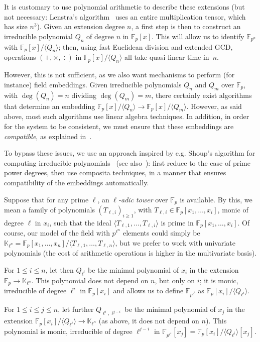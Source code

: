 \documentclass{sig-alternate}
\def\F {\ensuremath{\mathbb{F}}}
\def\K {\ensuremath{\mathbb{K}}}
\newcounter{algo}
\newcommand{\ang}[1]{\langle#1\rangle}
\begin{document}
It is customary to use polynomial arithmetic to describe these
extensions (but not necessary: Lenstra's algorithm~\cite{LenstraJr91}
uses an entire multiplication tensor, which has size $n^3$). Given an
extension degree $n$, a first step is then to construct an irreducible
polynomial $Q_n$ of degree $n$ in $\F_p[x]$. This will allow us to
identify $\F_{p^n}$ with $\F_p[x]/\ang{Q_n}$; then, using fast
Euclidean division and extended GCD, operations $(+,\times,\div)$ in
$\F_p[x]/\ang{Q_n}$ all take quasi-linear time in~$n$.

However, this is not sufficient, as we also want mechanisms to perform
(for instance) field embeddings. Given irreducible polynomials $Q_n$
and $Q_m$ over $\F_p$, with $\deg(Q_n)=n$ dividing $\deg(Q_m)=m$,
there certainly exist algorithms that determine an embedding
$\F_p[x]/\ang{Q_n} \to \F_p[x]/\ang{Q_m}$. However, as said above,
most such algorithms use linear algebra techniques. In addition, in
order for the system to be consistent, we must ensure that these
embeddings are {\em compatible}, as explained
in~\cite{bosma+cannon+steel97}.

To bypass these issues, we use an approach inspired by e.g. Shoup's
algorithm for computing irreducible polynomials~\cite{Shoup90,shoup94}
(see also~\cite{couveignes+lercier11,lenstra+desmit08-stdmodels}):
first reduce to the case of prime power degrees, then use composita
techniques, in a manner that ensures compatibility of the embeddings
automatically.

\smallskip{}
Suppose that for any prime $\ell$, an {\em $\ell$-adic tower} over
$\F_p$ is available. By this, we mean a family of polynomials
$(T_{\ell,i})_{i \ge 1}$, with $T_{\ell,i} \in \F_p[x_1,\dots,x_i]$,
monic of degree $\ell$ in $x_i$, such that the ideal
$\ang{T_{\ell,1},\dots,T_{\ell,i}}$ is prime in $\F_p[x_1,\dots,x_i]$.
Of course, our model of the field with $p^{\ell^n}$ elements could
simply be
$\K_{\ell^n}=\F_p[x_1,\dots,x_n]/\ang{T_{\ell,1},\dots,T_{\ell,n}}$,
but we prefer to work with univariate polynomials (the cost of
arithmetic operations is higher in the multivariate basis).  

For $1 \le i \le n$, let then $Q_{\ell^i}$ be the minimal polynomial
of $x_i$ in the extension $\F_p \to \K_{\ell^n}$. This polynomial does
not depend on $n$, but only on $i$; it is monic, irreducible of degree
$\ell^i$ in $\F_p[x_i]$ and allows us to define $\F_{p^{\ell^i}}$ as
$\F_p[x_i]/\ang{Q_{\ell^i}}$.

For $1 \le i \le j \le n$, let further $Q_{\ell^i,\ell^{j-i}}$ be the
minimal polynomial of $x_j$ in the extension
$\F_p[x_i]/\ang{Q_{\ell^i}} \to \K_{\ell^n}$ (as above, it does not
depend on $n$). This polynomial is monic, irreducible of degree
$\ell^{j-i}$ in $\F_{p^{\ell^i}}[x_j]=\F_p[x_i]/\ang{Q_{\ell^i}}[x_j]$.
\end{document}
